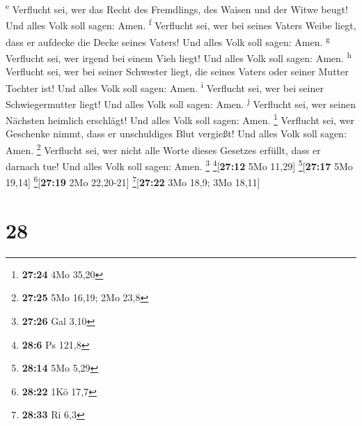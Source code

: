\textsuperscript{e}  Verflucht sei, wer das Recht des
Fremdlings, des Waisen und der Witwe beugt! Und alles Volk soll sagen:
Amen. \textsuperscript{f}  Verflucht sei, wer bei seines
Vaters Weibe liegt, dass er aufdecke die Decke seines Vaters! Und alles
Volk soll sagen: Amen. \textsuperscript{g}  Verflucht
sei, wer irgend bei einem Vieh liegt! Und alles Volk soll sagen: Amen.
\textsuperscript{h}  Verflucht sei, wer bei seiner
Schwester liegt, die seines Vaters oder seiner Mutter Tochter ist! Und
alles Volk soll sagen: Amen. \textsuperscript{i} 
Verflucht sei, wer bei seiner Schwiegermutter liegt! Und alles Volk soll
sagen: Amen. \textsuperscript{j}  Verflucht sei, wer
seinen Nächsten heimlich erschlägt! Und alles Volk soll sagen: Amen.
\footnote{\textbf{27:24} 4Mo 35,20}  Verflucht sei, wer
Geschenke nimmt, dass er unschuldiges Blut vergießt! Und alles Volk soll
sagen: Amen. \footnote{\textbf{27:25} 5Mo 16,19; 2Mo 23,8}
 Verflucht sei, wer nicht alle Worte dieses Gesetzes
erfüllt, dass er darnach tue! Und alles Volk soll sagen: Amen.
\footnote{\textbf{27:26} Gal 3,10} \footnote{\textbf{28:6} Ps 121,8}{[}\textbf{27:12}
5Mo 11,29{]} \footnote{\textbf{28:14} 5Mo 5,29}{[}\textbf{27:17} 5Mo
19,14{]} \footnote{\textbf{28:22} 1Kö 17,7}{[}\textbf{27:19} 2Mo
22,20-21{]} \footnote{\textbf{28:33} Ri 6,3}{[}\textbf{27:22} 3Mo 18,9;
3Mo 18,11{]}

\hypertarget{section-27}{%
\section{28}\label{section-27}}

